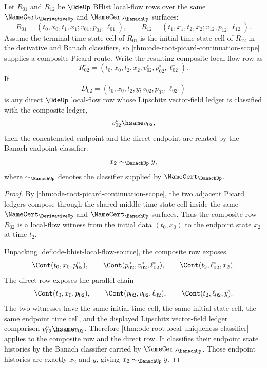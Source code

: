 \begin{theorem}
\label{thm:ode-local-flow-concatenation-endpoint-determinacy}
Let $R_{01}$ and $R_{12}$ be $\OdeUp$ BHist local-flow rows over the same
$\NameCert_{\DerivativeUp}$ and $\NameCert_{\BanachUp}$ surfaces:
$$
R_{01}=(t_0,x_0,t_1,x_1;v_{01},p_{01},\ell_{01}),\qquad
R_{12}=(t_1,x_1,t_2,x_2;v_{12},p_{12},\ell_{12}).
$$
Assume the terminal time-state cell of $R_{01}$ is the initial time-state cell
of $R_{12}$ in the derivative and Banach classifiers, so
\autoref{thm:ode-root-picard-continuation-scope} supplies a composite Picard
route. Write the resulting composite local-flow row as
$$
R_{02}^{\circ}=(t_0,x_0,t_2,x_2;v_{02}^{\circ},p_{02}^{\circ},\ell_{02}^{\circ}).
$$
If
$$
D_{02}=(t_0,x_0,t_2,y;v_{02},p_{02},\ell_{02})
$$
is any direct $\OdeUp$ local-flow row whose Lipschitz vector-field ledger is
classified with the composite ledger,
$$
v_{02}^{\circ}\hsame v_{02},
$$
then the concatenated endpoint and the direct endpoint are related by the
Banach endpoint classifier:
$$
x_2\sim_{\BanachUp}y,
$$
where $\sim_{\BanachUp}$ denotes the classifier supplied by
$\NameCert_{\BanachUp}$.
\end{theorem}
\begin{proof}
By \autoref{thm:ode-root-picard-continuation-scope}, the two adjacent Picard
ledgers compose through the shared middle time-state cell inside the same
$\NameCert_{\DerivativeUp}$ and $\NameCert_{\BanachUp}$ surfaces. Thus the
composite row $R_{02}^{\circ}$ is a local-flow witness from the initial data
$(t_0,x_0)$ to the endpoint state $x_2$ at time $t_2$.

Unpacking \autoref{def:ode-bhist-local-flow-source}, the composite row exposes
$$
\Cont(t_0,x_0,p_{02}^{\circ}),\qquad
\Cont(p_{02}^{\circ},v_{02}^{\circ},\ell_{02}^{\circ}),\qquad
\Cont(t_2,\ell_{02}^{\circ},x_2).
$$
The direct row exposes the parallel chain
$$
\Cont(t_0,x_0,p_{02}),\qquad
\Cont(p_{02},v_{02},\ell_{02}),\qquad
\Cont(t_2,\ell_{02},y).
$$
The two witnesses have the same initial time cell, the same initial state
cell, the same endpoint time cell, and the displayed Lipschitz vector-field
ledger comparison $v_{02}^{\circ}\hsame v_{02}$. Therefore
\autoref{thm:ode-root-local-uniqueness-classifier} applies to the composite
row and the direct row. It classifies their endpoint state histories by the
Banach classifier carried by $\NameCert_{\BanachUp}$. Those endpoint histories
are exactly $x_2$ and $y$, giving $x_2\sim_{\BanachUp}y$.
\end{proof}

